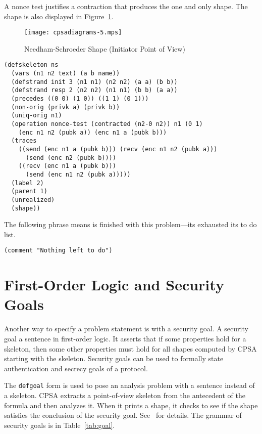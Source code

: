 \documentclass[12pt]{article}
\begin{document}
A nonce test justifies a contraction that produces the one and only
shape.  The shape is also displayed in Figure~\ref{fig:ns init pov}.

\begin{figure}
\begin{center}
\texttt{[image: cpsadiagrams-5.mps]}
\caption{Needham-Schroeder Shape (Initiator Point of View)}
\label{fig:ns init pov}
\end{center}
\end{figure}

\begin{verbatim}
(defskeleton ns
  (vars (n1 n2 text) (a b name))
  (defstrand init 3 (n1 n1) (n2 n2) (a a) (b b))
  (defstrand resp 2 (n2 n2) (n1 n1) (b b) (a a))
  (precedes ((0 0) (1 0)) ((1 1) (0 1)))
  (non-orig (privk a) (privk b))
  (uniq-orig n1)
  (operation nonce-test (contracted (n2-0 n2)) n1 (0 1)
    (enc n1 n2 (pubk a)) (enc n1 a (pubk b)))
  (traces
    ((send (enc n1 a (pubk b))) (recv (enc n1 n2 (pubk a)))
      (send (enc n2 (pubk b))))
    ((recv (enc n1 a (pubk b)))
      (send (enc n1 n2 (pubk a)))))
  (label 2)
  (parent 1)
  (unrealized)
  (shape))
\end{verbatim}

The following phrase means {\cpsa} is finished with this problem---its
exhausted its to do list.

\begin{verbatim}
(comment "Nothing left to do")
\end{verbatim}

\section{First-Order Logic and Security Goals}\label{sec:security goals}

Another way to specify a problem statement is with a security goal. A
security goal a sentence in first-order logic.  It asserts that if
some properties hold for a skeleton, then some other properties must
hold for all shapes computed by CPSA starting with the skeleton.
Security goals can be used to formally state authentication and
secrecy goals of a protocol.

The \texttt{defgoal} form is used to pose an analysis problem with a
sentence instead of a skeleton.  CPSA extracts a point-of-view
skeleton from the antecedent of the formula and then analyzes it.
When it prints a shape, it checks to see if the shape satisfies the
conclusion of the security goal.  See~\cite{cpsagoals09} for details.
The grammar of security goals is in Table~\ref{tab:goal}.
\end{document}
